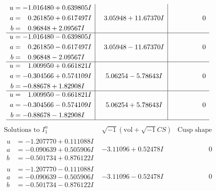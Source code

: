 \documentclass[1p]{elsarticle_modified}
\theoremstyle{definition}
\newcommand{\I}{\sqrt{-1}}
\begin{document}
$$\begin{array}{c|c|c}
\begin{aligned}
u &= -1.016480 + 0.639805 I \\
a &= \phantom{-}0.261850 + 0.617497 I \\
b &= \phantom{-}0.96848 + 2.09567 I\end{aligned}
 & \phantom{-}3.05948 + 11.67370 I & \phantom{-0.000000 } 0 \\ \hline\begin{aligned}
u &= -1.016480 - 0.639805 I \\
a &= \phantom{-}0.261850 - 0.617497 I \\
b &= \phantom{-}0.96848 - 2.09567 I\end{aligned}
 & \phantom{-}3.05948 - 11.67370 I & \phantom{-0.000000 } 0 \\ \hline\begin{aligned}
u &= \phantom{-}1.009950 + 0.661821 I \\
a &= -0.304566 + 0.574109 I \\
b &= -0.88678 + 1.82908 I\end{aligned}
 & \phantom{-}5.06254 - 5.78643 I & \phantom{-0.000000 } 0 \\ \hline\begin{aligned}
u &= \phantom{-}1.009950 - 0.661821 I \\
a &= -0.304566 - 0.574109 I \\
b &= -0.88678 - 1.82908 I\end{aligned}
 & \phantom{-}5.06254 + 5.78643 I & \phantom{-0.000000 } 0\\
 \hline 
 \end{array}$$\newpage$$\begin{array}{c|c|c}  
\text{Solutions to }I^u_{1}& \I (\text{vol} + \sqrt{-1}CS) & \text{Cusp shape}\\
 \hline 
\begin{aligned}
u &= -1.207770 + 0.111088 I \\
a &= -0.090639 + 0.505906 I \\
b &= -0.501734 + 0.876122 I\end{aligned}
 & -3.11096 + 0.52478 I & \phantom{-0.000000 } 0 \\ \hline\begin{aligned}
u &= -1.207770 - 0.111088 I \\
a &= -0.090639 - 0.505906 I \\
b &= -0.501734 - 0.876122 I\end{aligned}
 & -3.11096 - 0.52478 I & \phantom{-0.000000 } 0 \\ \hline\begin{aligned}

\end{aligned}
\end{array}$$
\end{document}
